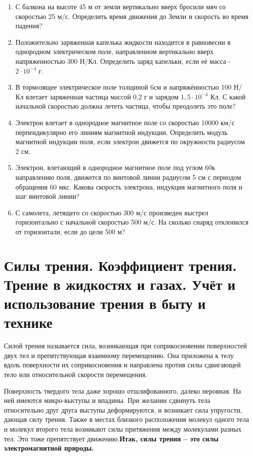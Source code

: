 \documentclass[a6paper, 11pt]{diss_4}
\renewcommand{\'}{\,'}
\begin{document}
\begin{enumerate}

\item С балкона на высоте 45 м от земли вертикально вверх бросили мяч со скоростью 25 м/с. Определить время движения до Земли и скорость во время падения?

\item Положительно заряженная капелька жидкости находится в равновесии в однородном электрическом поле, направленном  вертикально вверх напряженностью 300 Н/Кл. Определить заряд капельки, если её масса  - $2\cdot10^{-4}$ г.

\item В тормозящее электрическое поле толщиной 6см и напряжённостью 100 Н/Кл влетает заряженная частица массой 0,2 г и зарядом
$1,5\cdot10^{-4}$ Кл. С какой начальной скоростью должна лететь частица, чтобы преодолеть это поле?

\item Электрон влетает в однородное магнитное поле со скоростью 10000 км/с перпендикулярно его линиям магнитной индукции. Определить модуль магнитной индукции поля, если электрон движется по окружности радиусом 2 см.

\item Электрон, влетающий в однородное магнитное поле под углом 60\textdegree к направлению поля, движется по винтовой линии радиусом 5 см с периодом обращения 60 мкс. Какова скорость электрона, индукция магнитного поля и шаг винтовой линии?

\item С самолета, летящего со скоростью 300 м/с произведен выстрел горизонтально с начальной скоростью 500 м/с. На сколько снаряд отклонился от горизонтали, если до цели  500 м?

\end{enumerate}


\section{Силы трения. Коэффициент трения. Трение в жидкостях и газах. Учёт и использование трения в быту и технике}

Силой трения называется сила, возникающая при соприкосновении поверхностей двух тел и препятствующая взаимному перемещению. Она приложена к телу вдоль поверхности их соприкосновения и направлена против силы сдвигающей тело или относительной скорости перемещения.

Поверхность твердого тела даже хорошо отшлифованного, далеко неровная. На ней имеются микро-выступы и впадины. При желании сдвинуть тела относительно друг друга выступы деформируются, и возникает сила упругости, дающая силу трения. Также в местах близкого расположения молекул одного тела и молекул второго тела возникают силы притяжения между молекулами разных тел. Это тоже препятствует движению.\textbf{Итак, силы трения -- это силы электромагнитной природы.}
\end{document}
